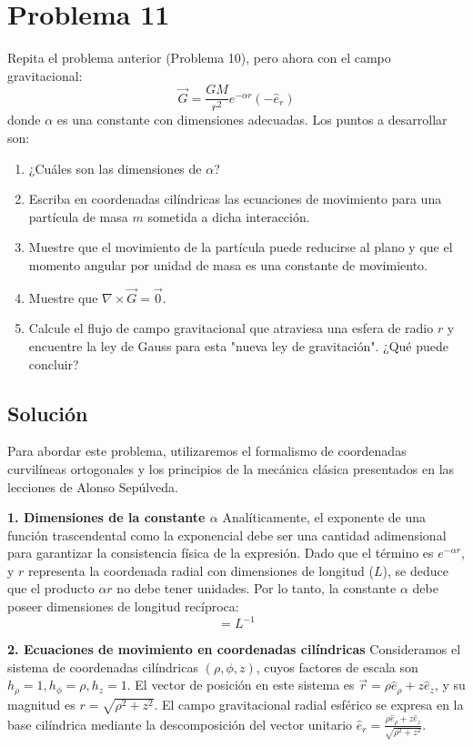 \documentclass[a4paper]{article}
\begin{document}
\section{Problema 11}
Repita el problema anterior (Problema 10), pero ahora con el campo gravitacional:
\begin{equation}
\vec{G} = \frac{GM}{r^2} e^{-\alpha r}(-\hat{e}_r)
\end{equation}
donde $\alpha$ es una constante con dimensiones adecuadas. Los puntos a desarrollar son:
\begin{enumerate}
    \item ¿Cuáles son las dimensiones de $\alpha$?
    \item Escriba en coordenadas cilíndricas las ecuaciones de movimiento para una partícula de masa $m$ sometida a dicha interacción.
    \item Muestre que el movimiento de la partícula puede reducirse al plano y que el momento angular por unidad de masa es una constante de movimiento.
    \item Muestre que $\nabla \times \vec{G} = \vec{0}$.
    \item Calcule el flujo de campo gravitacional que atraviesa una esfera de radio $r$ y encuentre la ley de Gauss para esta "nueva ley de gravitación". ¿Qué puede concluir?
\end{enumerate}

\subsection{Solución}

Para abordar este problema, utilizaremos el formalismo de coordenadas curvilíneas ortogonales y los principios de la mecánica clásica presentados en las lecciones de Alonso Sepúlveda.

\textbf{1. Dimensiones de la constante $\alpha$}
Analíticamente, el exponente de una función trascendental como la exponencial debe ser una cantidad adimensional para garantizar la consistencia física de la expresión. Dado que el término es $e^{-\alpha r}$, y $r$ representa la coordenada radial con dimensiones de longitud ($L$), se deduce que el producto $\alpha r$ no debe tener unidades. Por lo tanto, la constante $\alpha$ debe poseer dimensiones de longitud recíproca:
\begin{equation}
[\alpha] = L^{-1}
\end{equation}

\textbf{2. Ecuaciones de movimiento en coordenadas cilíndricas}
Consideramos el sistema de coordenadas cilíndricas $(\rho, \phi, z)$, cuyos factores de escala son $h_\rho = 1, h_\phi = \rho, h_z = 1$. El vector de posición en este sistema es $\vec{r} = \rho \hat{e}_\rho + z \hat{e}_z$, y su magnitud es $r = \sqrt{\rho^2 + z^2}$. El campo gravitacional radial esférico se expresa en la base cilíndrica mediante la descomposición del vector unitario $\hat{e}_r = \frac{\rho \hat{e}_\rho + z \hat{e}_z}{\sqrt{\rho^2 + z^2}}$.
\end{document}
